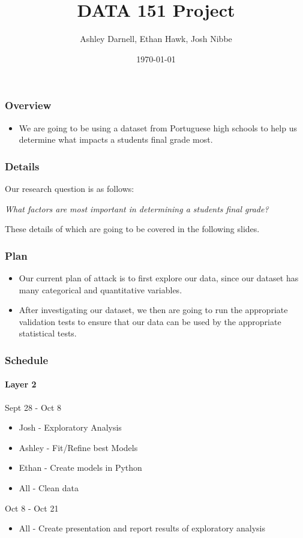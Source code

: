 \documentclass{beamer}
\title{DATA 151 Project}
\author{Ashley Darnell, Ethan Hawk, Josh Nibbe}
\institute{Valparaiso University}
\date{\today}
\begin{document}
\begin{frame}
\titlepage
\end{frame}


\begin{frame}
\frametitle{Overview}
  \begin{itemize}
    \item We are going to be using a dataset from Portuguese high schools to help us determine what impacts a students final grade most.
  \end{itemize}
\end{frame}


\begin{frame}
\frametitle{Details}
Our research question is as follows:

  \begin{center}
    \textit{What factors are most important in determining a students final grade?}
  \end{center}


These details of which are going to be covered in the following slides.
\end{frame}


\begin{frame}
\frametitle{Plan}
  \begin{itemize}
    \item Our current plan of attack is to first explore our data, since our dataset has many categorical and
quantitative variables.

    \item After investigating our dataset, we then are going to run the appropriate validation tests to ensure that our data
can be used by the appropriate statistical tests.

  \end{itemize}
\end{frame}

\begin{frame}
\frametitle{Schedule}
\framesubtitle{Layer 2}
    Sept 28 - Oct 8
      \begin{itemize}
        \item Josh - Exploratory Analysis
        \item Ashley - Fit/Refine best Models
        \item Ethan - Create models in Python
        \item All - Clean data
      \end{itemize}

    Oct 8 - Oct 21
      \begin{itemize}
        \item All - Create presentation and report results of exploratory analysis
      \end{itemize}

\end{frame}
\end{document}
